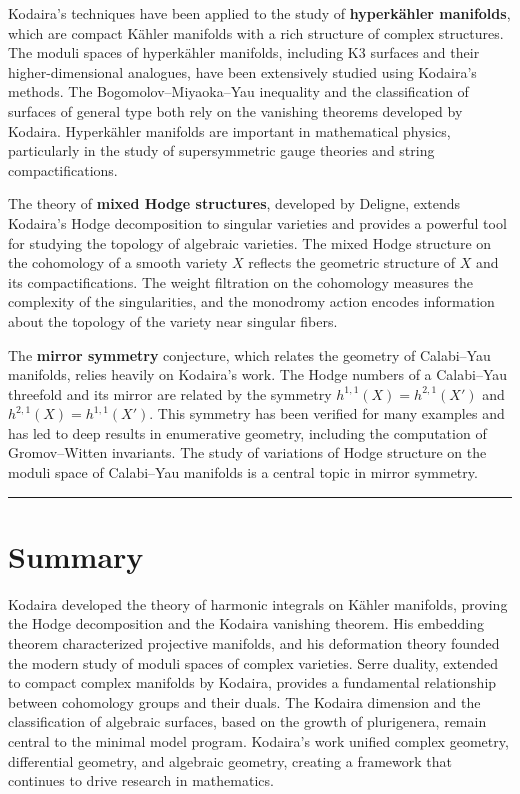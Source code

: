 Kodaira's techniques have been applied to the study of
\textbf{hyperk{\"a}hler manifolds}, which are compact K{\"a}hler
manifolds with a rich structure of complex structures. The moduli
spaces of hyperk{\"a}hler manifolds, including K3 surfaces and their
higher-dimensional analogues, have been extensively studied using
Kodaira's methods. The Bogomolov--Miyaoka--Yau inequality and the
classification of surfaces of general type both rely on the vanishing
theorems developed by Kodaira. Hyperk{\"a}hler manifolds are important
in mathematical physics, particularly in the study of supersymmetric
gauge theories and string compactifications.

The theory of \textbf{mixed Hodge structures}, developed by Deligne,
extends Kodaira's Hodge decomposition to singular varieties and
provides a powerful tool for studying the topology of algebraic
varieties. The mixed Hodge structure on the cohomology of a smooth
variety $X$ reflects the geometric structure of $X$ and its
compactifications. The weight filtration on the cohomology measures the
complexity of the singularities, and the monodromy action encodes
information about the topology of the variety near singular fibers.

The \textbf{mirror symmetry} conjecture, which relates the geometry of
Calabi--Yau manifolds, relies heavily on Kodaira's work. The Hodge
numbers of a Calabi--Yau threefold and its mirror are related by the
symmetry $h^{1,1}(X) = h^{2,1}(X')$ and $h^{2,1}(X) = h^{1,1}(X')$.
This symmetry has been verified for many examples and has led to deep
results in enumerative geometry, including the computation of
Gromov--Witten invariants. The study of variations of Hodge structure
on the moduli space of Calabi--Yau manifolds is a central topic in
mirror symmetry.

\begin{center}\rule{0.5\linewidth}{0.5pt}\end{center}

\section*{Summary}

Kodaira developed the theory of harmonic integrals on K{\"a}hler
manifolds, proving the Hodge decomposition and the Kodaira vanishing
theorem. His embedding theorem characterized projective manifolds, and
his deformation theory founded the modern study of moduli spaces of
complex varieties. Serre duality, extended to compact complex manifolds
by Kodaira, provides a fundamental relationship between cohomology
groups and their duals. The Kodaira dimension and the classification of
algebraic surfaces, based on the growth of plurigenera, remain central
to the minimal model program. Kodaira's work unified complex geometry,
differential geometry, and algebraic geometry, creating a framework
that continues to drive research in mathematics.
